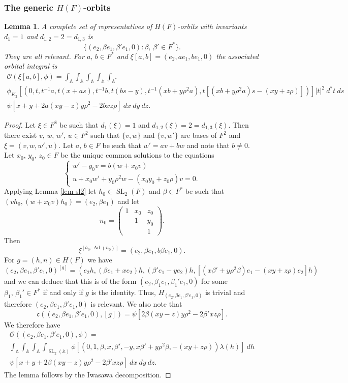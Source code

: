 \documentclass[12pt]{amsart}
\newcommand{\abs}[1]{\left|{#1}\right|}
\newcommand{\SL}{\operatorname{SL}}
\newcommand{\Ad}{\operatorname{Ad}}
\newcommand{\A}{\mathbb{A}}
\renewcommand{\O}{\mathcal{O}}
\renewcommand{\c}{\mathfrak{c}}
\newtheorem{lemma}[theorem]{Lemma}
\theoremstyle{remark}
\begin{document}
\subsubsection{The generic $H(F)$-orbits}
\begin{lemma}\label{relevant-5}
A complete set of representatives of $H(F)$-orbits with invariants $d_1=1$ and $d_{1,2}=2=d_{1,3}$ is 
\[
\{(e_2,\beta e_1,\beta' e_1,0):\beta,\,\beta'\in F^*\}.
\]
They are all relevant. For $a,\,b\in F^*$ and $\xi[a,b]=(e_2,a e_1,be_1,0)$ the associated orbital integral is
\begin{multline*}
\O(\xi[a,b],\phi)= \int_{\A}\int_{\A}\int_{\A}\int_\A \int_{\A^*} \\ \phi_{K_2}[(0,t,t^{-1}a,t(x+as),t^{-1}b,t(bs-y),t^{-1}(xb+y\rho^2a),t[(xb+y\rho^2a)s-(xy+z\rho)])]\abs{t}^2\ d^*t \ ds\\ \psi[x+y+2a(xy-z)y\rho^2-2bxz\rho] \ dx\ dy\ dz.
\end{multline*}
\end{lemma}
\begin{proof}
Let $\xi\in F^8$ be such that $d_1(\xi)=1$ and $d_{1,2}(\xi)=2=d_{1,3}(\xi)$. Then there exist $v,\,w,\,w',\,u\in F^2$ such that $\{v,w\}$ and $\{v,w'\}$ are bases of $F^2$ and 
$\xi=(v,w,w',u)$. Let $a,\,b\in F$ be such that $w'=a v+b w$ and note that $b\ne 0$. Let $x_0,\,y_0,\,z_0\in F$ be the unique common solutions to the equations
\[
\begin{cases} w'-y_0 v=b(w+x_0 v) \\ u+x_0 w'+y_0\rho^2 w-(x_0y_0+z_0\rho)v=0.\end{cases}
\]
Applying Lemma \ref{lem sl2} let $h_0\in \SL_2(F)$ and $\beta\in F^*$ be such that $(vh_0, (w+x_0 v)h_0)=(e_2,\beta e_1)$ and let
\[
n_0=\begin{pmatrix} 1 & x_0 & z_0 \\ & 1 & y_0 \\ & & 1 \end{pmatrix}.
\] 
Then
\[
\xi^{[h_0,\Ad(n_0)]}=(e_2,\beta e_1, b\beta e_1,0).
\]
For $g=(h,n)\in H(F)$ we have
\[
(e_2,\beta e_1,\beta' e_1,0)^{[g]}=(e_2 h, (\beta e_1+x e_2)h, (\beta' e_1-y e_2)h, [(x\beta'+y\rho^2 \beta)e_1-(xy+z\rho)e_2]h)
\]
and we can deduce that this is of the form $(e_2,\beta_1 e_1,\beta_1' e_1,0)$ for some $\beta_1,\,\beta_1'\in F^*$ if and only if $g$ is the identity. 
Thus, $H_{(e_2,\beta e_1,\beta' e_1,0)}$ is trivial and therefore $(e_2,\beta e_1,\beta' e_1,0)$ is relevant. 
We also note that
\[
\c((e_2,\beta e_1,\beta' e_1,0),[g])=\psi[2\beta(xy-z)y\rho^2-2\beta'xz\rho].
\]
We therefore have
\begin{multline*}
\O((e_2,\beta e_1,\beta' e_1,0),\phi)=\\ \int_{\A}\int_{\A}\int_{\A}\int_{\SL_2(\A)} \phi[(0,1,\beta,x,\beta',-y,x\beta'+y\rho^2\beta,-(xy+z\rho))\lambda(h)]\ dh\\ \psi[x+y+2\beta(xy-z)y\rho^2-2\beta'xz\rho] \ dx\ dy\ dz.
\end{multline*}
The lemma follows by the Iwasawa decomposition. 
\end{proof}
\end{document}
